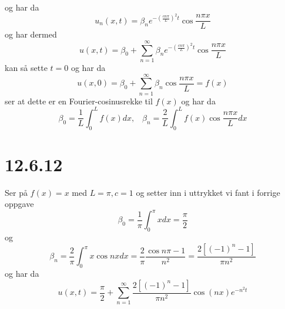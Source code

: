 \documentclass{report}
\newcommand{\nbrack}[1]{\left( #1 \right)}
\newcommand{\bbrack}[1]{\left[ #1 \right]}
\begin{document}
og har da
\begin{equation}
  \label{eq:11}
  u_{n}(x, t) = \beta_{n} e^{-\nbrack{ \frac{cn\pi}{L} }^{2}t} \cos \frac{n\pi x}{L}
\end{equation}
og har dermed
\begin{equation}
  \label{eq:12}
  u(x, t) = \beta_{0} + \sum_{n = 1}^{\infty} \beta_{n} e^{-\nbrack{ \frac{cn\pi}{L} }^{2}t} \cos \frac{n\pi x}{L}
\end{equation}
kan så sette $t=0$ og har da
\begin{equation}
  \label{eq:13}
  u(x, 0) = \beta_{0} + \sum_{n = 1}^{\infty} \beta_{n} \cos \frac{n\pi x}{L} = f(x)
\end{equation}
ser at dette er en Fourier-cosinusrekke til $f(x)$ og har da
\begin{equation}
  \label{eq:14}
  \beta_{0} = \frac{1}{L} \int_{0}^{L} f(x) dx, \;\;\; \beta_{n} = \frac{2}{L} \int_{0}^{L} f(x) \cos \frac{n\pi x}{L} dx
\end{equation}



\section*{12.6.12}
Ser på $f(x) = x$ med $L=\pi, c=1$ og setter inn i uttrykket vi fant i forrige oppgave
\begin{equation}
  \label{eq:15}
  \beta_{0} = \frac{1}{\pi} \int_{0}^{\pi} x dx = \frac{\pi}{2}
\end{equation}
og
\begin{equation}
  \label{eq:16}
  \beta_{n} = \frac{2}{\pi} \int_{0}^{\pi} x\cos nx dx = \frac{2}{\pi} \frac{\cos n\pi - 1}{n^{2}} = \frac{ 2\bbrack{ (-1)^{n} - 1 }}{\pi n^{2}}
\end{equation}
og har da
\begin{equation}
  \label{eq:17}
  u(x, t) = \frac{\pi}{2} + \sum_{n=1}^{\infty} \frac{2\bbrack{ (-1)^{n} - 1 }}{\pi n^{2}} \cos (nx) e^{-n^{2}t}
\end{equation}
\end{document}
